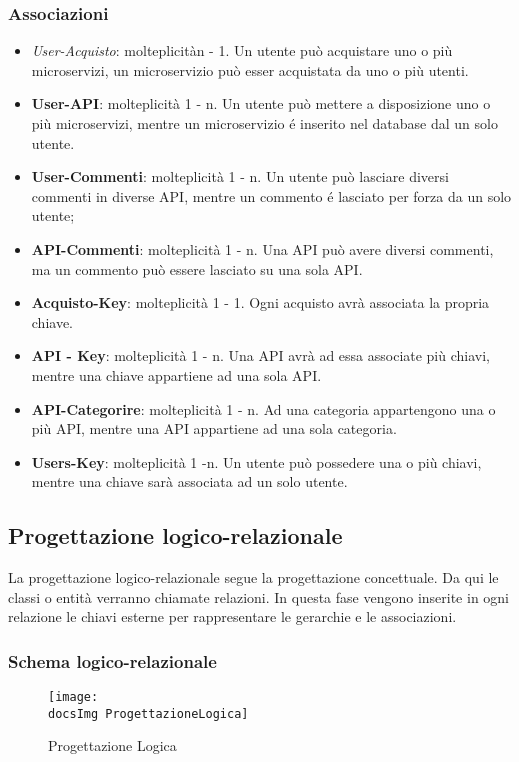 {{	\subsubsection{Associazioni}
		\begin{itemize}
			\item\textit{User-Acquisto}: molteplicitàn - 1. Un utente può acquistare uno o più microservizi, un microservizio può esser acquistata da uno o più utenti.
			\item\textbf{User-API}: molteplicità 1 - n. Un utente può mettere a disposizione uno o più microservizi, mentre un microservizio é inserito nel database dal un solo utente.
			\item\textbf{User-Commenti}: molteplicità 1 - n. Un utente può lasciare diversi commenti in diverse API, mentre un commento é lasciato per forza da un solo utente;
			\item\textbf{API-Commenti}: molteplicità 1 - n. Una API può avere diversi commenti, ma un commento può essere lasciato su una sola API.	
			\item\textbf{Acquisto-Key}: molteplicità 1 - 1. Ogni acquisto avrà associata la propria chiave. 
			\item\textbf{API - Key}: molteplicità 1 - n. Una API avrà ad essa associate più chiavi, mentre una chiave appartiene ad una sola API.
			\item\textbf{API-Categorire}: molteplicità 1 - n. Ad una categoria appartengono una o più API, mentre una API appartiene ad una sola categoria.
			\item\textbf{Users-Key}: molteplicità 1 -n. Un utente può possedere una o più chiavi, mentre una chiave sarà associata ad un solo utente.
		\end{itemize}				
	}
	\subsection{Progettazione logico-relazionale}{
		La progettazione logico-relazionale segue la progettazione concettuale. Da qui le classi o entità verranno chiamate relazioni. In questa fase vengono inserite in ogni relazione le chiavi esterne per rappresentare le gerarchie e le associazioni.
		\subsubsection{Schema logico-relazionale}
		\begin{figure}[ht]
			\centering
			\texttt{[image: \\docsImg ProgettazioneLogica]}
			\caption{Progettazione Logica}
			\label{Fig. Progettazione Logica}
		\end{figure}
}}
